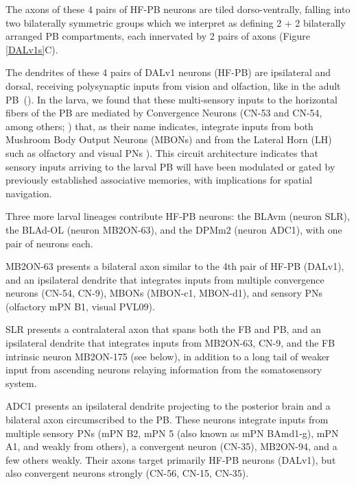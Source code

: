     The axons of these 4 pairs of HF-PB neurons are tiled dorso-ventrally, falling into two bilaterally symmetric groups which we interpret as defining 2 + 2 bilaterally arranged PB compartments, each innervated by 2 pairs of axons (Figure \ref{DALv1s}C). %


    The dendrites of these 4 pairs of DALv1 neurons (HF-PB) are ipsilateral and dorsal, receiving polysynaptic inputs from vision and olfaction, like in the adult PB~(\citep{hulse2021connectome}). In the larva, we found that these multi-sensory inputs to the horizontal fibers of the PB are mediated by Convergence Neurons (CN-53 and CN-54, among others; \citep{eschbach2021circuits}) that, as their name indicates, integrate inputs from both Mushroom Body Output Neurons (MBONs) and from the Lateral Horn (LH) such as olfactory and visual PNs \citep{eschbach2020recurrent}). This circuit architecture indicates that sensory inputs arriving to the larval PB will have been modulated or gated by previously established associative memories, with implications for spatial navigation.

    Three more larval lineages contribute HF-PB neurons: the BLAvm (neuron SLR), the BLAd-OL (neuron MB2ON-63), and the DPMm2 (neuron ADC1),  with one pair of neurons each. 

    MB2ON-63 presents a bilateral axon similar to the 4th pair of HF-PB (DALv1), and an ipsilateral dendrite that integrates inputs from multiple convergence neurons (CN-54, CN-9), MBONs (MBON-c1, MBON-d1), and sensory PNs (olfactory mPN B1, visual PVL09).

    SLR presents a contralateral axon that spans both the FB and PB, and an ipsilateral dendrite that integrates inputs from MB2ON-63, CN-9, and the FB intrinsic neuron MB2ON-175 (see below), in addition to a long tail of weaker input from ascending neurons relaying information from the somatosensory system.

    ADC1 presents an ipsilateral dendrite projecting to the posterior brain and a bilateral axon circumscribed to the PB. These neurons integrate inputs from multiple sensory PNs (mPN B2, mPN 5 (also known as mPN BAmd1-g), mPN A1, and weakly from others), a convergent neuron (CN-35), MB2ON-94, and a few others weakly. Their axons target primarily HF-PB neurons (DALv1), but also convergent neurons strongly (CN-56, CN-15, CN-35).




